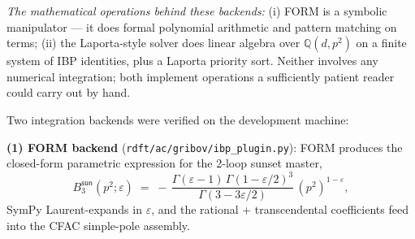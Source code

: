 \documentclass[11pt,a4paper]{article}
\theoremstyle{definition}
\theoremstyle{plain}
\begin{document}
\begin{codebox}
\emph{The mathematical operations behind these backends:}
(i) FORM is a symbolic manipulator --- it does formal polynomial
arithmetic and pattern matching on terms; (ii) the Laporta-style
solver does linear algebra over $\mathbb{Q}(d, p^2)$ on a finite
system of IBP identities, plus a Laporta priority sort.  Neither
involves any numerical integration; both implement operations a
sufficiently patient reader could carry out by hand.

Two integration backends were verified on the development machine:

\textbf{(1) FORM backend} (\texttt{rdft/ac/gribov/ibp\_plugin.py}):
FORM produces the closed-form parametric expression for the 2-loop
sunset master,
\[
  B_3^{\textsf{sun}}(p^2; \varepsilon) \;=\;
  -\,\frac{\Gamma(\varepsilon - 1)\,\Gamma(1 - \varepsilon/2)^3}
        {\Gamma(3 - 3\varepsilon/2)}\,(p^2)^{1-\varepsilon},
\]
SymPy Laurent-expands in $\varepsilon$, and the rational +
transcendental coefficients feed into the CFAC simple-pole assembly.


\end{codebox}
\end{document}
